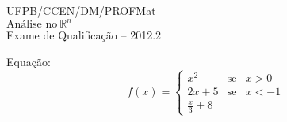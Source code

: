 \documentclass[11pt]{report}
\begin{document}
	\thispagestyle{empty}
	
	\noindent
	\begin{minipage}[c]{0.2\linewidth}
	\end{minipage} %
	\begin{minipage}[c]{0.7\linewidth}
		\begin{center}
			UFPB/CCEN/DM/PROFMat \\
			$\mbox{Análise no} \ \mathbb{R}^{n}$ \\
			Exame de Qualificação -- 2012.2
		\end{center}
	\end{minipage}
	
	\vspace{0.8cm}
	
	Equação:
	$$
	f(x)= \left \{ \begin{array}{ccl}
	x^2 & \mbox {se} & x > 0 \\
	2x + 5 & \mbox{se} & x < -1 \\
	\frac{x}{3} + 8 & &
	\end{array}\right.
	$$
	
\end{document}
